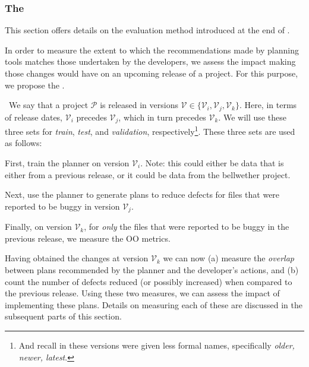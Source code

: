 \subsubsection{The \ktest}
\label{sect:ktest}

This section offers details on the evaluation method introduced
at the end of .

In order to measure the extent to which the recommendations made by planning tools matches those undertaken by the developers,
we assess the impact making those changes would have on an upcoming release of a project. For this purpose, we propose the \ktest. 

~{\color{steel}We say that a project $\mathcal{P}$ is released in versions $\mathcal{V}\in\{\mathcal{V}_{i}, \mathcal{V}_j, \mathcal{V}_{k}\}$. Here, in terms of release dates, $\mathcal{V}_i$ precedes $\mathcal{V}_j$, which in turn precedes $\mathcal{V}_k$.} We will use these three sets for  \textit{train}, \textit{test}, and \textit{validation}, respectively\footnote{And recall in 
 these versions were  given less formal names, specifically
{\em older, newer, latest}.}. These
three sets  are used as follows:

\be
\item First, train the planner on version $\mathcal{V}_{i}$. Note: this could either be data that is either from a previous release, or it could be data from the bellwether project. 

\item Next, use the planner to generate plans to reduce defects for files that were reported to be buggy in version $\mathcal{V}_{j}$.

\item Finally, on version $\mathcal{V}_{k}$, for \textit{only} the files that were reported to be buggy in the previous release, we measure the OO metrics. 
\ee

Having obtained the changes at version $\mathcal{V}_{k}$ we can now (a) measure the \textit{overlap} between plans recommended by the planner and the developer's actions, and (b) count the number of defects reduced (or possibly increased) when compared to the previous release. Using these two measures, we can assess the impact of implementing these plans. Details on measuring each of these are discussed in the subsequent parts of this section.

